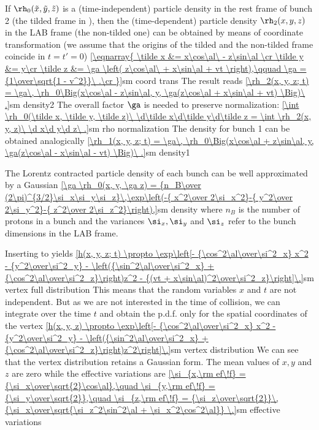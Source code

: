 If $\rh_0(\tilde x, \tilde y, \tilde z)$ is a (time-independent) particle density in the rest frame of bunch 2 (the tilded frame in ), then the (time-dependent) particle density $\rh_2(x, y, z)$ in the LAB frame (the non-tilded one) can be obtained by means of coordinate transformation (we assume that the origins of the tilded and the non-tilded frame coincide in $t=t'=0$)
\eqref{\eqnarray{
\tilde x &= x\cos\al\ - z\sin\al \cr
\tilde y &= y\cr
\tilde z &= \ga \left( z\cos\al\ + x\sin\al + vt \right),\qquad \ga = {1\over\sqrt{1 - v^2}}\ .\cr
}}{sm coord trans}
The result reads
\eqref{\rh_2(x, y, z; t) = \ga\, \rh_0\Big(x\cos\al - z\sin\al, y, \ga(z\cos\al + x\sin\al + vt) \Big)\ .}{sm density2}
The overall factor $\ga$ is needed to preserve normalization:
\eqref{\int \rh_0(\tilde x, \tilde y, \tilde z)\ \d\tilde x\d\tilde y\d\tilde z = \int \rh_2(x, y, z)\ \d x\d y\d z\ .}{sm rho normalization}
The density for bunch 1 can be obtained analogically
\eqref{\rh_1(x, y, z; t) = \ga\, \rh_0\Big(x\cos\al + z\sin\al, y, \ga(z\cos\al - x\sin\al - vt) \Big)\ .}{sm density1}

The Lorentz contracted particle density of each bunch can be well approximated by a Gaussian 
\eqref{\ga \rh_0(x, y, \ga z) = {n_B\over (2\pi)^{3/2}\si_x\si_y\si_z}\,\exp\left(-{ x^2\over 2\si_x^2}-{ y^2\over 2\si_y^2}-{ z^2\over 2\si_z^2}\right),}{sm density}
where $n_B$ is the number of protons in a bunch and the variances $\si_x, \si_y$ and $\si_z$ refer to the bunch dimensions in the LAB frame.

Inserting  to  yields
\eqref{h(x, y, z; t) \propto \exp\left[- {\cos^2\al\over\si^2_x} x^2 - {y^2\over\si^2_y} - \left({\sin^2\al\over\si^2_x} + {\cos^2\al\over\si^2_z}\right)z^2 - {(vt + x\sin\al)^2\over\si^2_z}\right]\.}{sm vertex full distribution}
This means that the random variables $x$ and $t$ are not independent. But as we are not interested in the time of collision, we can integrate over the time $t$ and obtain the \hbox{p.d.f.} only for the spatial coordinates of the vertex
\eqref{h(x, y, z) \propto \exp\left[- {\cos^2\al\over\si^2_x} x^2 - {y^2\over\si^2_y} - \left({\sin^2\al\over\si^2_x} + {\cos^2\al\over\si^2_z}\right)z^2\right]\.}{sm vertex distribution}
We can see that the vertex distribution retains a Gaussian form. The mean values of $x, y$ and $z$ are zero while the effective variations are
\eqref{\si_{x,\rm ef\!f} = {\si_x\over\sqrt{2}\cos\al},\quad \si_{y,\rm ef\!f} = {\si_y\over\sqrt{2}},\quad \si_{z,\rm ef\!f} = {\si_z\over\sqrt{2}}\,{\si_x\over\sqrt{\si_z^2\sin^2\al + \si_x^2\cos^2\al}} \.}{sm effective variations}

